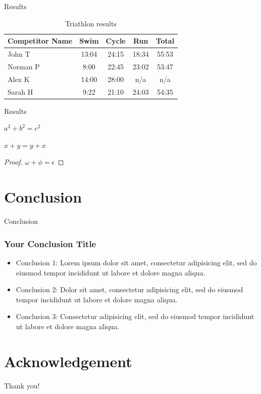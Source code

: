\documentclass[10pt]{beamer}
\begin{document}
    \begin{frame}{Results}
        \begin{table}
            \begin{tabular}{l | c | c | c | c }
                Competitor Name & Swim  & Cycle & Run   & Total \\
                \hline \hline
                John T          & 13:04 & 24:15 & 18:34 & 55:53 \\
                Norman P        & 8:00  & 22:45 & 23:02 & 53:47 \\
                Alex K          & 14:00 & 28:00 & n/a   & n/a   \\
                Sarah H         & 9:22  & 21:10 & 24:03 & 54:35
            \end{tabular}
            \caption{Triathlon results}
            \label{tab:table}
        \end{table}
    \end{frame}

    \begin{frame}{Results}
        \begin{theorem}[Pythagoras]
            $ a^2 + b^2 = c^2$
        \end{theorem}
        \begin{corollary}
            $ x + y = y + x  $
        \end{corollary}
        \begin{proof}
            $\omega +\phi = \epsilon $
        \end{proof}
    \end{frame}


    \section{Conclusion}

    \begin{frame}{Conclusion}
        \frametitle{Your Conclusion Title}
        \begin{itemize}
            \item Conclusion 1: Lorem ipsum dolor sit amet, consectetur adipisicing elit, sed do eiusmod tempor incididunt ut labore et dolore magna aliqua.
            \item Conclusion 2: Dolor sit amet, consectetur adipisicing elit, sed do eiusmod tempor incididunt ut labore et dolore magna aliqua.
            \item Conclusion 3: Consectetur adipisicing elit, sed do eiusmod tempor incididunt ut labore et dolore magna aliqua.
        \end{itemize}
    \end{frame}


    \section*{Acknowledgement}
    \begin{frame}
        \textcolor{myNewColorA}{\Huge{\centerline{Thank you!}}}
    \end{frame}
\end{document}
